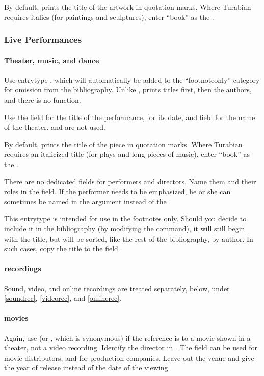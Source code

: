\documentclass{ltxdockit}[2010/02/12]
\begin{document}
 By default,  prints the title of the artwork in quotation marks. Where Turabian requires italics (\eg for paintings and sculptures), enter ``book'' as the .

\subsubsection{Live Performances}
\paragraph{Theater, music, and dance}
Use entrytype , which will automatically be added to the ``footnoteonly'' category for omission from the bibliography. Unlike ,  prints titles first, then the authors, and there is no  function.\autocites[][]{westbirdie-blue} 

Use the  field for the title of the performance,  for its date, and  field for the name of the theater.  and  are not used.

By default,  prints the title of the piece in quotation marks. Where Turabian requires an italicized title (\eg for plays and long pieces of music), enter ``book'' as the .

There are no dedicated fields for performers and directors. Name them and their roles in the  field. If the performer needs to be emphasized, he or she can sometimes be named in the  argument instead of the .

This entrytype is intended for use in the footnotes only. Should you decide to include it in the bibliography (by modifying the  command), it will still begin with the title, but will be sorted, like the rest of the bibliography, by author. In such cases, copy the title to the  field.

\paragraph{recordings}
Sound, video, and online recordings are treated separately, below, under \ref{soundrec}, \ref{videorec}, and \ref{onlinerec}.

\paragraph{movies}
Again, use  (or , which is synonymous) if the reference is to a movie shown in a theater, not a video recording. Identify the director in . The  field can be used for movie distributors, and  for production companies. Leave out the venue and give the year of release instead of the date of the viewing.\autocites[][]{capote}
\end{document}
